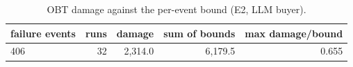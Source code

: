 \begin{table}[t]
\centering
\small
\caption{OBT damage against the per-event bound (E2, LLM buyer).}
\label{tab:damage_vs_bound}
\begin{tabular}{lrrrr}
\toprule
failure events & runs & damage & sum of bounds & max damage/bound \\
\midrule
406 & 32 & 2,314.0 & 6,179.5 & 0.655 \\
\bottomrule
\end{tabular}
\end{table}
